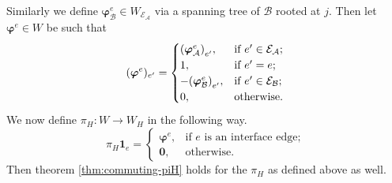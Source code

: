 \documentclass[ ]{elsarticle}
\newcommand{\cA}{\mathcal{A}}
\newcommand{\cB}{\mathcal{B}}
\newcommand{\cE}{\mathcal{E}}
\newcommand{\esp}{W}
\newcommand{\eone}{\mathbf{1}}
\let\originalleft\left
\let\originalright\right
\renewcommand{\left}{\mathopen{}\mathclose\bgroup\originalleft}
\renewcommand{\right}{\aftergroup\egroup\originalright}
\numberwithin{equation}{section}
\begin{document}
Similarly we define $\bm\varphi^e_\cB\in\esp_{\cE_\cA}$ via a spanning
tree of $\cB$ rooted at $j$. Then let $\bm\varphi^e\in\esp$ be such
that
\begin{equation*}
  (\bm\varphi^e)_{e'} =
  \begin{cases}
    \left(\bm\varphi^e_\cA\right)_{e'},  & \text{if } e' \in \cE_\cA; \\
    1,                                  & \text{if } e' = e; \\
    -\left(\bm\varphi^e_\cB\right)_{e'}, & \text{if } e' \in \cE_\cB; \\
    0,                                  & \text{otherwise.}
  \end{cases}
\end{equation*}
We now define $\pi_H\colon\esp\to\esp_H$ in the following way.
\begin{equation*}
  \pi_H\eone_e =
  \begin{cases}
    \bm\varphi^e, & \text{if } e \text{ is an interface edge;} \\
    \bm0,         & \text{otherwise.}
  \end{cases}
\end{equation*}
Then theorem \ref{thm:commuting-piH} holds for the $\pi_H$ as defined
above as well.
\end{document}
